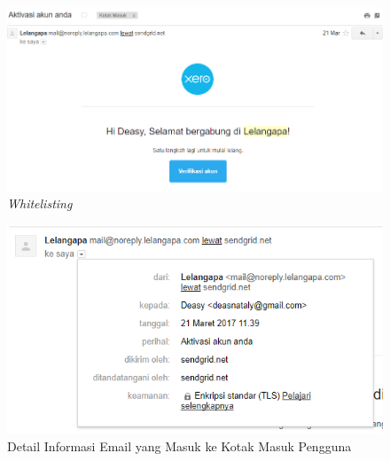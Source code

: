 	\begin{figure}[H]
		\centering
		\includegraphics[height=\textwidth]{images/bab4/pl/whitelist-success.png}
		\caption{\textit{Whitelisting}}
		\label{whitelist-success}
	\end{figure}
	
	\indent 
	\begin{figure}[H]
		\centering
		\includegraphics[height=\textwidth]{images/bab4/pl/detail-whitelist.png}
		\caption{Detail Informasi Email yang Masuk ke Kotak Masuk Pengguna}
		\label{detail-whitelist}
	\end{figure}
	